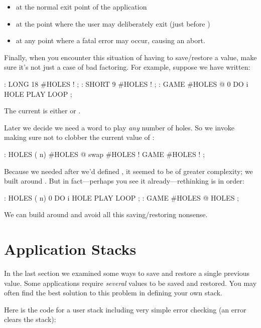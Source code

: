 \begin{itemize}
\item at the normal exit point of the application
\item at the point where the user may deliberately exit (just before
)
\item at any point where a fatal error may occur, causing an abort.
\end{itemize}

Finally, when you encounter this situation of having to save/restore a
value, make sure it's not just a case of bad factoring. For example,
suppose we have written:

\begin{Code}
: LONG   18 #HOLES ! ;
: SHORT   9 #HOLES ! ;
: GAME   #HOLES @  0 DO  i HOLE PLAY  LOOP ;
\end{Code}
The current  is either  or .

Later we decide we need a word to play \emph{any} number of holes. So
we invoke  making sure not to clobber the current value of
:

\begin{Code}
: HOLES  ( n)  #HOLES @  swap #HOLES !  GAME  #HOLES ! ;
\end{Code}
Because we needed  after we'd defined , it
seemed to be of greater complexity; we built  around
. But in fact---perhaps you see it already---rethinking is
in order:

\begin{Code}
: HOLES ( n)  0 DO  i HOLE PLAY  LOOP ;
: GAME   #HOLES @ HOLES ;
\end{Code}
We can build  around  and avoid all this
saving/restoring nonsense.%
%

\section{Application Stacks}

In the last section we examined some ways to save and restore a single
previous value. Some applications require \emph{several} values to be
saved and restored. You may often find the best solution to this problem
in defining your own stack.

Here is the code for a user stack including very simple error checking
(an error clears the stack):


